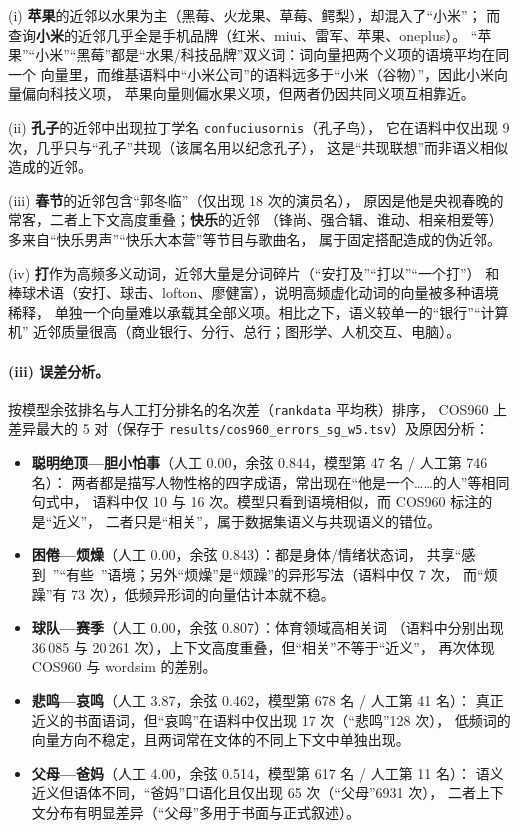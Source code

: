 \documentclass[11pt,a4paper]{article}
\begin{document}
(i) \textbf{苹果}的近邻以水果为主（黑莓、火龙果、草莓、鳄梨），却混入了“小米”；
而查询\textbf{小米}的近邻几乎全是手机品牌（红米、miui、雷军、苹果、oneplus）。
“苹果”“小米”“黑莓”都是“水果/科技品牌”双义词：词向量把两个义项的语境平均在同一个
向量里，而维基语料中“小米公司”的语料远多于“小米（谷物）”，因此小米向量偏向科技义项，
苹果向量则偏水果义项，但两者仍因共同义项互相靠近。

(ii) \textbf{孔子}的近邻中出现拉丁学名 \texttt{confuciusornis}（孔子鸟），
它在语料中仅出现 9 次，几乎只与“孔子”共现（该属名用以纪念孔子），
这是“共现联想”而非语义相似造成的近邻。

(iii) \textbf{春节}的近邻包含“郭冬临”（仅出现 18 次的演员名），
原因是他是央视春晚的常客，二者上下文高度重叠；\textbf{快乐}的近邻
（锋尚、强合辑、谁动、相亲相爱等）多来自“快乐男声”“快乐大本营”等节目与歌曲名，
属于固定搭配造成的伪近邻。

(iv) \textbf{打}作为高频多义动词，近邻大量是分词碎片（“安打及”“打以”“一个打”）
和棒球术语（安打、球击、lofton、廖健富），说明高频虚化动词的向量被多种语境稀释，
单独一个向量难以承载其全部义项。相比之下，语义较单一的“银行”“计算机”
近邻质量很高（商业银行、分行、总行；图形学、人机交互、电脑）。

\paragraph{(iii) 误差分析。}
按模型余弦排名与人工打分排名的名次差（\texttt{rankdata} 平均秩）排序，
COS960 上差异最大的 5 对（保存于 \texttt{results/cos960\_errors\_sg\_w5.tsv}）及原因分析：

\begin{itemize}
  \item \textbf{聪明绝顶—胆小怕事}（人工 0.00，余弦 0.844，模型第 47 名 / 人工第 746 名）：
  两者都是描写人物性格的四字成语，常出现在“他是一个……的人”等相同句式中，
  语料中仅 10 与 16 次。模型只看到语境相似，而 COS960 标注的是“近义”，
  二者只是“相关”，属于数据集语义与共现语义的错位。
  \item \textbf{困倦—烦燥}（人工 0.00，余弦 0.843）：都是身体/情绪状态词，
  共享“感到~”“有些~”语境；另外“烦燥”是“烦躁”的异形写法（语料中仅 7 次，
  而“烦躁”有 73 次），低频异形词的向量估计本就不稳。
  \item \textbf{球队—赛季}（人工 0.00，余弦 0.807）：体育领域高相关词
  （语料中分别出现 36\,085 与 20\,261 次），上下文高度重叠，但“相关”不等于“近义”，
  再次体现 COS960 与 wordsim 的差别。
  \item \textbf{悲鸣—哀鸣}（人工 3.87，余弦 0.462，模型第 678 名 / 人工第 41 名）：
  真正近义的书面语词，但“哀鸣”在语料中仅出现 17 次（“悲鸣”128 次），
  低频词的向量方向不稳定，且两词常在文体的不同上下文中单独出现。
  \item \textbf{父母—爸妈}（人工 4.00，余弦 0.514，模型第 617 名 / 人工第 11 名）：
  语义近义但语体不同，“爸妈”口语化且仅出现 65 次（“父母”6931 次），
  二者上下文分布有明显差异（“父母”多用于书面与正式叙述）。
\end{itemize}
\end{document}
